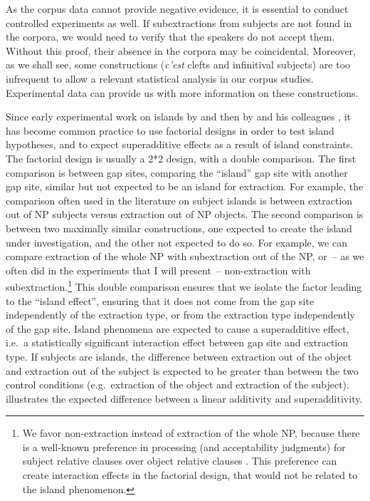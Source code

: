 As the corpus data cannot provide negative evidence, it is essential to conduct controlled experiments as well. If subextractions from subjects are not found in the corpora, we would need to verify that the speakers do not accept them. Without this proof, their absence in the corpora may be coincidental. Moreover, as we shall see, some constructions (\textit{c'est} clefts and infinitival subjects) are too infrequent to allow a relevant statistical analysis in our corpus studies. Experimental data can provide us with more information on these constructions. 

Since early experimental work on islands by \citet{Kluender.1993.Bridging,Kluender.1993.Subjacency} and then by \citeauthor{Sprouse.2007.PhD} and his colleagues \citep[e.g.][]{Sprouse.2011,Sprouse.2012,Sprouse.2016,Sprouse.2017.design}, it has become common practice to use factorial designs in order to test island hypotheses, and to expect superadditive effects as a result of island constraints. The factorial design is usually a 2*2 design, with a double comparison. The first comparison is between gap sites, comparing the ``island'' gap site with another gap site, similar but not expected to be an island for extraction. For example, the comparison often used in the literature on subject islands is between extraction out of NP subjects versus extraction out of NP objects. The second comparison is between two maximally similar constructions, one expected to create the island under investigation, and the other not expected to do so. For example, we can compare extraction of the whole NP with subextraction out of the NP, or~-- as we often did in the experiments that I will present~-- non-extraction with subextraction.\footnote{We favor non-extraction instead of extraction of the whole NP, because there is a well-known preference in processing (and acceptability judgments) for subject relative clauses over object relative clauses \citep[a.o.][]{Wanner.1978,Traxler.2002,Pozniak.2015}. This preference can create interaction effects in the factorial design, that would not be related to the island phenomenon.} This double comparison ensures that we isolate the factor leading to the ``island effect'', ensuring that it does not come from the gap site independently of the extraction type, or from the extraction type independently of the gap site. Island phenomena are expected to cause a superadditive effect, i.e.\ a statistically significant interaction effect between gap site and extraction type. If subjects are islands, the difference between extraction out of the object and extraction out of the subject is expected to be greater than between the two control conditions (e.g.\ extraction of the object and extraction of the subject).  illustrates the expected difference between a linear additivity and superadditivity.

